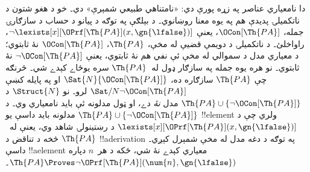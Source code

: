 \documentclass[../../../include/open-logic-section]{subfiles}
\begin{document}
دا نامعياري عناصر په زړه پورې دي: «نامتناهي طبيعي شمېرې» دي۔
خو د هغو شتون د ناتکميلۍ پديدې هم په يوه معنا روښانوي۔ د بېلګې په
توګه د پيانو د حساب د سازګارۍ جمله، $\OCon[\Th{PA}]$، يعنې
$\lnot \lexists[x][\OPrf[\Th{PA}](x, \gn{\lfalse})]$، راواخلئ۔
د ناتکميلۍ د دويمې قضيې له مخې، $\Th{PA}$، $\OCon[\Th{PA}]$ نۀ ثابتوي؛ د معياري مدل د سموالي له مخې ئې نفي هم نۀ ثابتوي، يعنې
$\lnot \OCon[\Th{PA}]$ نۀ ثابتوي۔ نو هره يوه جمله په سازګار ډول له~$\Th{PA}$
سره يوځاے کېدے شي۔ څرنګه چې $\Th{PA}$ سازګاره ده،
$\Sat{N}{\OCon[\Th{PA}]}$ او په پايله کښې
$\Sat/{N}{\lnot \OCon[\Th{PA}]}$ لرو۔ نو $\Struct{N}$ د
$\Th{PA} \cup \{\lnot \OCon[\Th{PA}]\}$ مدل \emph{نۀ} دے، او ټول
مدلونه ئې بايد نامعياري وي۔ د $\Th{PA} \cup
\{\lnot \OCon[\Th{PA}]\}$ مدلونه بايد داسې يو !!{element} ولري چې د
$\lexists[x][\OPrf[\Th{PA}](x,\gn{\lfalse})]$ د رښتينولۍ شاهد وي، يعنې
له~$\Th{PA}$ څخه د تناقض د !!a{derivation} په توګه د دغه مدل له مخې شمېرل کېږي۔ داسې
!!a{element} معياري کېدے نۀ شي، ځکه د هر~$n$ دپاره
$\Th{PA} \Proves \lnot \OPrf[\Th{PA}](\num{n}, \gn{\lfalse})$۔
\end{document}
